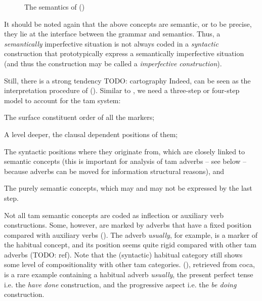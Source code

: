 \documentclass[UTF8, a4paper, oneside, scheme=plain]{ctexrep}
\newcommand*{\term}[1]{\emph{#1}}
\newcommand{\corpus}[1]{\emph{#1}}
\begin{document}
\begin{figure}[H]
    \centering
    
    \caption{The semantics of ()}
    \label{fig:semantics-tam-1}
\end{figure}

It should be noted again that the above concepts are semantic,
or to be precise, 
they lie at the interface between the grammar and semantics.
Thus, a \emph{semantically} imperfective situation 
is not always coded in a \emph{syntactic} construction 
that prototypically express a semantically imperfective situation
(and thus the construction may be called a \term{imperfective construction}).

Still, there is a strong tendency TODO: cartography
Indeed,  can be seen as 
the interpretation procedure of ().
Similar to , 
we need a three-step or four-step model to account for the \acs{tam} system:
\begin{enumerate*}
    \item The surface constituent order of all the markers;
    \item A level deeper, 
    the clausal dependent positions of them;
    \item The syntactic positions where they originate from,
    which are closely linked to semantic concepts
    (this is important for analysis of \acs{tam} adverbs -- see below --
    because adverbs can be moved for information structural reasons), and 
    \item The purely semantic concepts,
    which may and may not be expressed by the last step.
\end{enumerate*}

Not all \acs{tam} semantic concepts are coded as inflection or auxiliary verb constructions.
Some, however, are marked by adverbs that have a fixed position 
compared with auxiliary verbs ().
The adverb \corpus{usually}, 
for example, is a marker of the habitual concept, 
and its position seems quite rigid compared with other \acs{tam} adverbs (TODO: ref).
Note that the (syntactic) habitual category still shows some level of compositionality 
with other \acs{tam} categories. 
(), 
retrieved from \ac{coca}, 
is a rare example containing 
a habitual adverb \corpus{usually}, 
the present perfect tense i.e. the \corpus{have done} construction,
and the progressive aspect i.e. the \corpus{be doing} construction.
\end{document}
